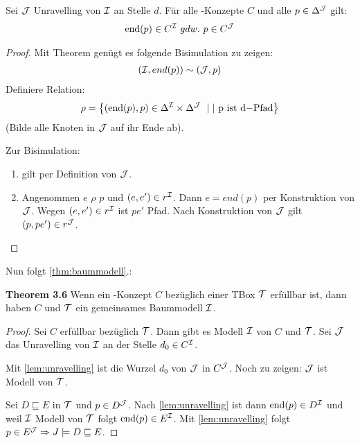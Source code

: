 \begin{lemma}[Unravelling]
    \label{lemma37}
    \label{lem:unravelling}
Sei $\mathcal{J}$ Unravelling von $\mathcal{I}$ an Stelle $d$. Für alle \ALC-Konzepte $C$ und alle $p \in \Delta^{\mathcal{J}}$ gilt:
\begin{align*}
\text{end}\left( p \right) \in C^\MI\ gdw.\ p \in C^{\MJ}
\end{align*}
\end{lemma}

\begin{tafel}
\begin{proof}
Mit Theorem genügt es folgende Bisimulation zu zeigen:
\begin{align*}
\left( \MI,end\left( p \right) \right)\sim\left( \MJ,p \right)\\
\end{align*}
Definiere Relation:
\begin{align*}
\rho = \left\{ \left( \text{end}\left( p \right),p \right) \in \Delta^\MI
        \times \Delta^{\MJ}\  \mid|\text{\ p\ }\mathrm{\text{ist}}\text{\ d}\mathrm{- Pfad}\right\}
\end{align*}
(Bilde alle Knoten in $\mathcal{J}$ auf ihr Ende ab). 

Zur Bisimulation:
\begin{enumerate}
\item gilt per Definition von $\mathcal{J}$.
\item
  Angenommen $e$ $\rho$ $p$ und
  $\left( e,e' \right) \in r^\MI$. Dann $e = end\left( p \right)$
  per Konstruktion von $\mathcal{J}$. Wegen $\left( e,e' \right) \in r^\MI$
  ist $pe'$ Pfad. Nach Konstruktion von $\mathcal{J}$ gilt
  $\left( p,pe' \right) \in r^{\MJ}$.
\end{enumerate}
\end{proof}
\end{tafel}

Nun folgt \autoref{thm:baummodell}.:

\textbf{Theorem 3.6} Wenn ein \ALC-Konzept $C$ bezüglich einer TBox $\mathcal{T}$ erfüllbar ist, dann haben $C$ und $\mathcal{T}$ ein gemeinsames Baummodell $\mathcal{I}$.

\begin{tafel}
\begin{proof}
Sei $C$ erfüllbar bezüglich $\mathcal{T}$. Dann gibt es Modell $\mathcal{I}$ von $C$ und $\mathcal{T}$. Sei $\mathcal{J}$ das Unravelling von $\mathcal{I}$ an der Stelle
$d_0 \in C^{\mathcal{I}}$.

Mit \autoref{lem:unravelling} ist die Wurzel $d_0$ von $\mathcal{J}$ in $C^{\mathcal{J}}$. Noch zu zeigen: $\mathcal{J}$ ist Modell von $\mathcal{T}$. 

Sei $D \sqsubseteq E$ in $\mathcal{T}$ und $p \in D^{\mathcal{J}}$. Nach
\autoref{lem:unravelling} ist dann $\text{end}\left( p \right) \in D^\MI$
und weil $\mathcal{I}$ Modell von $\mathcal{T}$ folgt $\text{end}\left( p \right) \in
E^\MI$. Mit \autoref{lem:unravelling} folgt $p \in E^{\mathcal{J}}
\Rightarrow J \models D \sqsubseteq E$. %
\end{proof}
\end{tafel}

